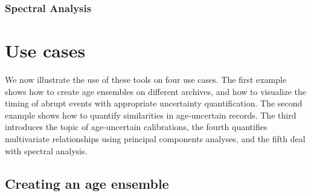 \documentclass[gc, manuscript]{copernicus}
\begin{document}
\subsubsection{Spectral Analysis}

\hypertarget{use-cases}{%
\section{Use cases}\label{use-cases}}

We now illustrate the use of these tools on four use cases. The first
example shows how to create age ensembles on different archives, and how
to visualize the timing of abrupt events with appropriate uncertainty
quantification. The second example shows how to quantify similarities in
age-uncertain records. The third introduces the topic of age-uncertain
calibrations, the fourth quantifies multivariate relationships using
principal components analyses, and the fifth deal with spectral
analysis.

\subsection{Creating an age ensemble}
\end{document}
